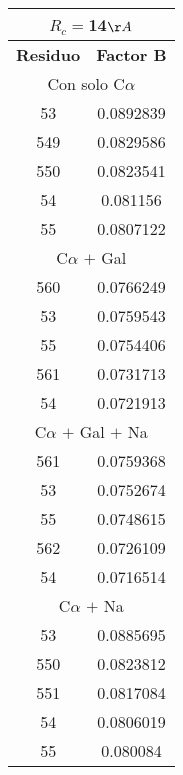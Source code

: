\begin{tabular}[c]{|c|c|}
\multicolumn{2}{c}{$R_c=$14$\AA$}\\\hline
\textbf{Residuo}&\textbf{Factor B}\\\hline
\multicolumn{2}{c}{Con solo C$\alpha$}\\\hline
        53& 0.0892839\\
       549& 0.0829586\\
       550& 0.0823541\\
        54&  0.081156\\
        55& 0.0807122\\\hline
\multicolumn{2}{c}{C$\alpha$ $+$ Gal}\\\hline
       560& 0.0766249\\
        53& 0.0759543\\
        55& 0.0754406\\
       561& 0.0731713\\
        54& 0.0721913\\\hline
\multicolumn{2}{c}{C$\alpha$ $+$ Gal $+$ Na}\\\hline
       561& 0.0759368\\
        53& 0.0752674\\
        55& 0.0748615\\
       562& 0.0726109\\
        54& 0.0716514\\\hline
\multicolumn{2}{c}{C$\alpha$ $+$ Na}\\\hline
        53& 0.0885695\\
       550& 0.0823812\\
       551& 0.0817084\\
        54& 0.0806019\\
        55&  0.080084\\\hline
\end{tabular}
